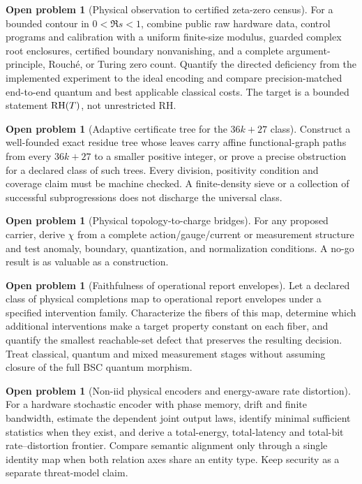 \documentclass[11pt,a4paper]{article}
\theoremstyle{definition}
\newtheorem{openproblem}[definition]{Open problem}
\theoremstyle{plain}
\theoremstyle{remark}
\begin{document}
\begin{openproblem}[Physical observation to certified zeta-zero census]
\label{op:zdq-census}
For a bounded contour in \(0<\Re s<1\), combine public raw hardware data,
control programs and calibration with a uniform finite-size modulus, guarded
complex root enclosures, certified boundary nonvanishing, and a complete
argument-principle, Rouch\'e, or Turing zero count.  Quantify the directed
deficiency from the implemented experiment to the ideal encoding and compare
precision-matched end-to-end quantum and best applicable classical costs.
The target is a bounded statement \({\rm RH}(T)\), not unrestricted RH.
\end{openproblem}

\begin{openproblem}[Adaptive certificate tree for the \(36k+27\) class]
Construct a well-founded exact residue tree whose leaves carry affine
functional-graph paths from every \(36k+27\) to a smaller positive integer,
or prove a precise obstruction for a declared class of such trees.  Every
division, positivity condition and coverage claim must be machine checked.
A finite-density sieve or a collection of successful subprogressions does
not discharge the universal class.
\end{openproblem}

\begin{openproblem}[Physical topology-to-charge bridges]
For any proposed carrier, derive \(\chi\) from a complete action/gauge/current
or measurement structure and test anomaly, boundary, quantization, and
normalization conditions.  A no-go result is as valuable as a construction.
\end{openproblem}

\begin{openproblem}[Faithfulness of operational report envelopes]
Let a declared class of physical completions map to operational report
envelopes under a specified intervention family.  Characterize the fibers of
this map, determine which additional interventions make a target property
constant on each fiber, and quantify the smallest reachable-set defect that
preserves the resulting decision.  Treat classical, quantum and mixed
measurement stages without assuming closure of the full BSC quantum morphism.
\end{openproblem}

\begin{openproblem}[Non-iid physical encoders and energy-aware rate distortion]
For a hardware stochastic encoder with phase memory, drift and finite
bandwidth, estimate the dependent joint output laws, identify minimal
sufficient statistics when they exist, and derive a total-energy,
total-latency and total-bit rate--distortion frontier.  Compare semantic
alignment only through a single identity map when both relation axes share an
entity type.  Keep security as a separate threat-model claim.
\end{openproblem}
\end{document}

